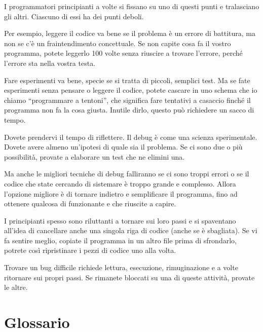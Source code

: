 \documentclass[10pt]{book}
\begin{document}
I programmatori principianti a volte si fissano su uno di questi punti e tralasciano gli altri. Ciascuno di essi ha dei punti deboli.

Per esempio, leggere il codice va bene se il problema è un errore di battitura, ma non se c'è un fraintendimento concettuale. Se non capite cosa fa il vostro programma, potete leggerlo 100 volte senza riuscire a trovare l'errore, perché l'errore sta nella vostra testa.

Fare esperimenti va bene, specie se si tratta di piccoli, semplici test. Ma se fate esperimenti senza pensare o leggere il codice, potete cascare in uno schema che io chiamo ``programmare a tentoni'', che significa fare tentativi a casaccio finché il programma non fa la cosa giusta. Inutile dirlo, questo può richiedere un sacco di tempo.

Dovete prendervi il tempo di riflettere. Il debug è come una scienza sperimentale. Dovete avere almeno un'ipotesi di quale sia il problema. Se ci sono due o più possibilità, provate a elaborare un test che ne elimini una.

Ma anche le migliori tecniche di debug falliranno se ci sono troppi errori o se il codice che state cercando di sistemare è troppo grande e complesso. Allora l'opzione migliore è di tornare indietro e semplificare il programma, fino ad ottenere qualcosa di funzionante e che riuscite a capire.

I principianti spesso sono riluttanti a tornare sui loro passi e si spaventano all'idea di cancellare anche una singola riga di codice (anche se è sbagliata). Se vi fa sentire meglio, copiate il programma in un altro file prima di sfrondarlo, potrete così ripristinare i pezzi di codice uno alla volta.

Trovare un bug difficile richiede lettura, esecuzione, rimuginazione e a volte ritornare sui propri passi. Se rimanete bloccati su una di queste attività, provate le altre.


\section{Glossario}
\end{document}
